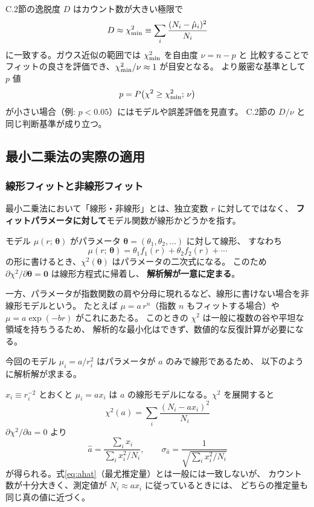 \documentclass[uplatex,dvipdfmx,12pt,nomag]{jsarticle}
\begin{document}
C.2節の逸脱度 $D$ はカウント数が大きい極限で
\begin{equation}
  D \approx \chi^2_{\rm min} \equiv \sum_{i}\frac{(N_i - \hat{\mu}_i)^2}{N_i}
\end{equation}
に一致する。ガウス近似の範囲では $\chi^2_{\rm min}$ を自由度 $\nu = n - p$ と
比較することでフィットの良さを評価でき、\textbf{$\chi^2_{\rm min}/\nu \approx 1$} が目安となる。
より厳密な基準として $p$ 値
\begin{equation}
  p = P\!\left(\chi^2 \ge \chi^2_{\rm min};\,\nu\right)
\end{equation}
が小さい場合（例: $p < 0.05$）にはモデルや誤差評価を見直す。
C.2節の $D/\nu$ と同じ判断基準が成り立つ。

\subsection{最小二乗法の実際の適用}

\subsubsection*{線形フィットと非線形フィット}

最小二乗法において「線形・非線形」とは、独立変数 $r$ に対してではなく、
\textbf{フィットパラメータに対して}モデル関数が線形かどうかを指す。

モデル $\mu(r;\,\bm{\theta})$ がパラメータ $\bm{\theta} = (\theta_1, \theta_2, \ldots)$ に対して線形、
すなわち
\begin{equation}
  \mu(r;\,\bm{\theta}) = \theta_1 f_1(r) + \theta_2 f_2(r) + \cdots
\end{equation}
の形に書けるとき、$\chi^2(\bm{\theta})$ はパラメータの二次式になる。
このため $\partial\chi^2/\partial\bm{\theta} = \bm{0}$ は線形方程式に帰着し、
\textbf{解析解が一意に定まる}。

一方、パラメータが指数関数の肩や分母に現れるなど、線形に書けない場合を非線形モデルという。
たとえば $\mu = a\,r^n$（指数 $n$ もフィットする場合）や $\mu = a\exp(-br)$ がこれにあたる。
このときの $\chi^2$ は一般に複数の谷や平坦な領域を持ちうるため、
解析的な最小化はできず、数値的な反復計算が必要になる。

今回のモデル $\mu_i = a/r_i^2$ はパラメータが $a$ のみで線形であるため、
以下のように解析解が求まる。

$x_i \equiv r_i^{-2}$ とおくと $\mu_i = a x_i$ は $a$ の線形モデルになる。$\chi^2$ を展開すると
\begin{equation}
  \chi^2(a) = \sum_{i}\frac{(N_i - a x_i)^2}{N_i}
\end{equation}
$\partial \chi^2/\partial a = 0$ より
\begin{equation}
  \hat{a}
  = \frac{\displaystyle\sum_{i} x_i}{\displaystyle\sum_{i} x_i^2 / N_i},
  \qquad
  \sigma_{\hat{a}}
  = \frac{1}{\displaystyle\sqrt{\sum_{i} x_i^2 / N_i}}
  \label{eq:lsq}
\end{equation}
が得られる。式\eqref{eq:ahat}（最尤推定量）とは一般には一致しないが、
カウント数が十分大きく、測定値が $N_i \approx a x_i$ に従っているときには、
どちらの推定量も同じ真の値に近づく。
\end{document}
